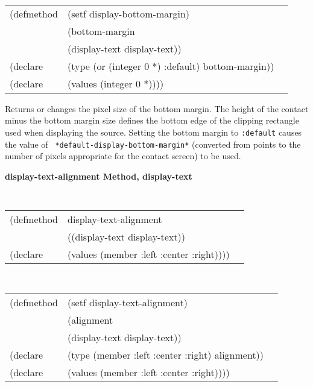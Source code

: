 \begin{flushright} \parbox[t]{6.125in}{
\tt
\begin{tabular}{lll}
\raggedright
(defmethod & (setf display-bottom-margin) & \\
& (bottom-margin \\
& (display-text  display-text)) \\
(declare &(type (or (integer 0 *) :default)  bottom-margin))\\
(declare & (values (integer 0 *))))
\end{tabular}
\rm}\end{flushright}

\begin{flushright} \parbox[t]{6.125in}{ 
Returns or changes the pixel size of the
bottom margin.  The height of the contact minus the bottom margin size defines
the bottom edge of the clipping rectangle used when displaying the source.
Setting the bottom margin to {\tt :default} causes the value of {\tt
*default-display-bottom-margin*} (converted from points to the number of pixels
appropriate for the contact screen) to be used.
  
}\end{flushright}



{\samepage  
{\large {\bf display-text-alignment \hfill Method, display-text}}
\begin{flushright} \parbox[t]{6.125in}{
\tt
\begin{tabular}{lll}
\raggedright
(defmethod & display-text-alignment & \\
& ((display-text  display-text)) \\
(declare & (values (member :left :center :right))))
\end{tabular}
\rm

}\end{flushright}}

\begin{flushright} \parbox[t]{6.125in}{
\tt
\begin{tabular}{lll}
\raggedright
(defmethod & (setf display-text-alignment) & \\
         & (alignment \\
         & (display-text  display-text)) \\
(declare &(type (member :left :center :right)  alignment))\\
(declare & (values (member :left :center :right))))
\end{tabular}
\rm}
\end{flushright}

